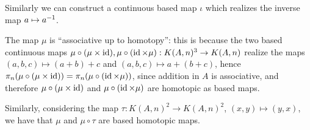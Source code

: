 Similarly we can construct a continuous based map $\iota$ which realizes the inverse map $a\mapsto a^{-1}$.

The map $\mu$ is \enquote{associative up to homotopy}: this is because the two based continuous maps $\mu\circ(\mu\times\operatorname{id}),\mu\circ(\operatorname{id}\times\mu):K(A,n)^3\to K(A,n)$ realize the maps $(a,b,c)\mapsto(a+b)+c$ and $(a,b,c)\mapsto a+(b+c)$, hence $\pi_n(\mu\circ(\mu\times\operatorname{id}))=\pi_n(\mu\circ(\operatorname{id}\times\mu))$, since addition in $A$ is associative, and therefore $\mu\circ(\mu\times\operatorname{id})$ and $\mu\circ(\operatorname{id}\times\mu)$ are homotopic as based maps.

Similarly, considering the map $\tau:K(A,n)^2\to K(A,n)^2$, $(x,y)\mapsto(y,x)$, we have that $\mu$ and $\mu\circ\tau$ are based homotopic maps.

\ 
